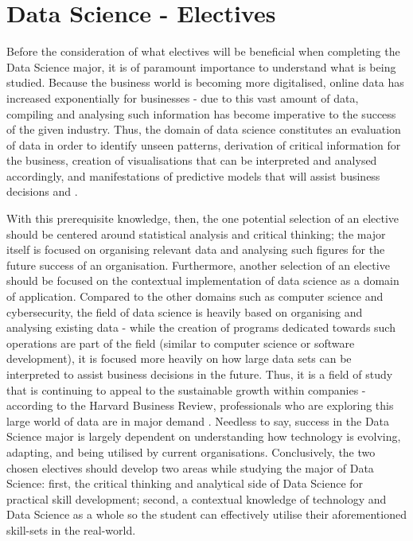 \section{\textbf{Data Science - Electives}}

Before the consideration of what electives will be beneficial when completing the Data Science major, it is of paramount importance to understand what is being studied. Because the business world is becoming more digitalised, online data has increased exponentially for businesses - due to this vast amount of data, compiling and analysing such information has become imperative to the success of the given industry. Thus, the domain of data science constitutes an evaluation of data in order to identify unseen patterns, derivation of critical information for the business, creation of visualisations that can be interpreted and analysed accordingly, and manifestations of predictive models that will assist business decisions \cite{Simplilearn} and \cite{Usyd0}. 


With this prerequisite knowledge, then, the one potential selection of an elective should be centered around statistical analysis and critical thinking; the major itself is focused on organising relevant data and analysing such figures for the future success of an organisation. Furthermore, another selection of an elective should be focused on the contextual implementation of data science as a domain of application. Compared to the other domains such as computer science and cybersecurity, the field of data science is heavily based on organising and analysing existing data - while the creation of programs dedicated towards such operations are part of the field (similar to computer science or software development), it is focused more heavily on how large data sets can be interpreted to assist business decisions in the future. Thus, it is a field of study that is continuing to appeal to the sustainable growth within companies - according to the Harvard Business Review, professionals who are exploring this large world of data are in major demand \cite{brynjolfsson}. Needless to say, success in the Data Science major is largely dependent on understanding how technology is evolving, adapting, and being utilised by current organisations. Conclusively, the two chosen electives should develop two areas while studying the major of Data Science: first, the critical thinking and analytical side of Data Science for practical skill development; second, a contextual knowledge of technology and Data Science as a whole so the student can effectively utilise their aforementioned skill-sets in the real-world.


